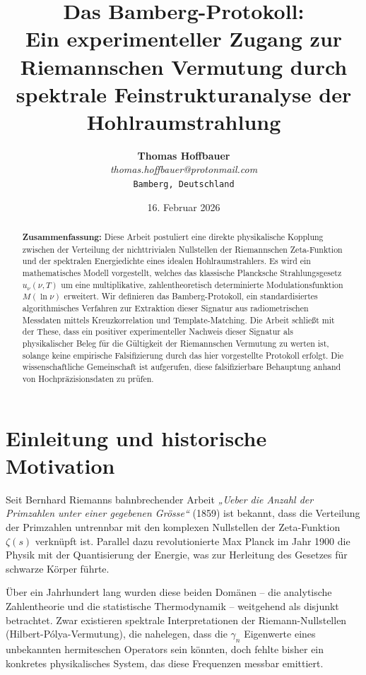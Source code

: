 \documentclass[11pt, a4paper]{article}
\title{\textbf{Das Bamberg-Protokoll:}\\ Ein experimenteller Zugang zur Riemannschen Vermutung durch spektrale Feinstrukturanalyse der Hohlraumstrahlung}
\author{
	\textbf{Thomas Hoffbauer} \\
	\textit{thomas.hoffbauer@protonmail.com} \\
	\texttt{Bamberg, Deutschland}
}
\date{16. Februar 2026}
\begin{document}
	
	\maketitle
	
	\begin{abstract}
		\noindent
		\textbf{Zusammenfassung:} Diese Arbeit postuliert eine direkte physikalische Kopplung zwischen der Verteilung der nichttrivialen Nullstellen der Riemannschen Zeta-Funktion und der spektralen Energiedichte eines idealen Hohlraumstrahlers. Es wird ein mathematisches Modell vorgestellt, welches das klassische Plancksche Strahlungsgesetz $u_\nu(\nu,T)$ um eine multiplikative, zahlentheoretisch determinierte Modulationsfunktion $M(\ln \nu)$ erweitert. Wir definieren das \glqq Bamberg-Protokoll\grqq, ein standardisiertes algorithmisches Verfahren zur Extraktion dieser Signatur aus radiometrischen Messdaten mittels Kreuzkorrelation und Template-Matching. Die Arbeit schließt mit der These, dass ein positiver experimenteller Nachweis dieser Signatur als physikalischer Beleg für die Gültigkeit der Riemannschen Vermutung zu werten ist, solange keine empirische Falsifizierung durch das hier vorgestellte Protokoll erfolgt. Die wissenschaftliche Gemeinschaft ist aufgerufen, diese falsifizierbare Behauptung anhand von Hochpräzisionsdaten zu prüfen.
	\end{abstract}
	
	\tableofcontents
	\newpage
	
	\section{Einleitung und historische Motivation}
	
	Seit Bernhard Riemanns bahnbrechender Arbeit \textit{„Ueber die Anzahl der Primzahlen unter einer gegebenen Grösse“} (1859) ist bekannt, dass die Verteilung der Primzahlen untrennbar mit den komplexen Nullstellen der Zeta-Funktion $\zeta(s)$ verknüpft ist. Parallel dazu revolutionierte Max Planck im Jahr 1900 die Physik mit der Quantisierung der Energie, was zur Herleitung des Gesetzes für schwarze Körper führte.
	
	Über ein Jahrhundert lang wurden diese beiden Domänen – die analytische Zahlentheorie und die statistische Thermodynamik – weitgehend als disjunkt betrachtet. Zwar existieren spektrale Interpretationen der Riemann-Nullstellen (Hilbert-Pólya-Vermutung), die nahelegen, dass die $\gamma_n$ Eigenwerte eines unbekannten hermiteschen Operators sein könnten, doch fehlte bisher ein konkretes physikalisches System, das diese Frequenzen messbar emittiert.
	
\end{document}
